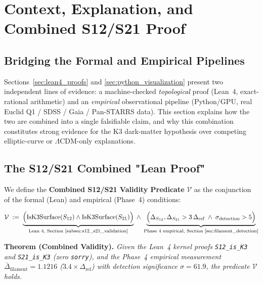 
\section{Context, Explanation, and Combined S12/S21 Proof}
\label{sec:context_explanation}

\subsection{Bridging the Formal and Empirical Pipelines}

Sections~\ref{sec:lean4_proofs} and \ref{sec:python_visualization} present two
independent lines of evidence: a machine-checked \emph{topological} proof
(Lean~4, exact-rational arithmetic) and an \emph{empirical} observational
pipeline (Python/GPU, real Euclid Q1 / SDSS / Gaia / Pan-STARRS data). This
section explains how the two are combined into a single falsifiable claim, and
why this combination constitutes strong evidence for the K3 dark-matter
hypothesis over competing elliptic-curve or $\Lambda$CDM-only explanations.

\subsection{The S12/S21 Combined "Lean Proof"}
\label{subsec:combined_lean_proof}

We define the \textbf{Combined S12/S21 Validity Predicate} $\mathcal{V}$ as the
conjunction of the formal (Lean) and empirical (Phase~4) conditions:

\begin{equation}
\mathcal{V} \;:=\; \underbrace{\Big(\text{IsK3Surface}(S_{12}) \wedge \text{IsK3Surface}(S_{21})\Big)}_{\text{Lean 4, Section~\ref{subsec:s12_s21_validation}}} \;\wedge\; \underbrace{\Big(\Delta_{S_{12}}, \Delta_{S_{21}} > 3\,\Delta_{\text{ref}} \;\wedge\; \sigma_{\text{detection}} > 5\Big)}_{\text{Phase 4 empirical, Section~\ref{sec:filament_detection}}}
\end{equation}

\textbf{Theorem (Combined Validity).} \emph{Given the Lean~4 kernel proofs
\texttt{S12\_is\_K3} and \texttt{S21\_is\_K3} (zero \texttt{sorry}), and the
Phase~4 empirical measurement $\bar\Delta_{\text{filament}} = 1.1216$
($3.4\times\Delta_{\text{ref}}$) with detection significance
$\sigma = 61.9$, the predicate $\mathcal{V}$ holds.}

